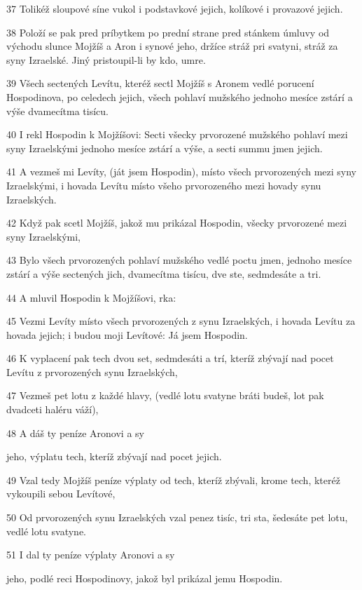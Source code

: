 \par 37 Tolikéž sloupové síne vukol i podstavkové jejich, kolíkové i provazové jejich.
\par 38 Položí se pak pred príbytkem po prední strane pred stánkem úmluvy od východu slunce Mojžíš a Aron i synové jeho, držíce stráž pri svatyni, stráž za syny Izraelské. Jiný pristoupil-li by kdo, umre.
\par 39 Všech sectených Levítu, kteréž sectl Mojžíš s Aronem vedlé porucení Hospodinova, po celedech jejich, všech pohlaví mužského jednoho mesíce zstárí a výše dvamecítma tisícu.
\par 40 I rekl Hospodin k Mojžíšovi: Secti všecky prvorozené mužského pohlaví mezi syny Izraelskými jednoho mesíce zstárí a výše, a secti summu jmen jejich.
\par 41 A vezmeš mi Levíty, (ját jsem Hospodin), místo všech prvorozených mezi syny Izraelskými, i hovada Levítu místo všeho prvorozeného mezi hovady synu Izraelských.
\par 42 Když pak scetl Mojžíš, jakož mu prikázal Hospodin, všecky prvorozené mezi syny Izraelskými,
\par 43 Bylo všech prvorozených pohlaví mužského vedlé poctu jmen, jednoho mesíce zstárí a výše sectených jich, dvamecítma tisícu, dve ste, sedmdesáte a tri.
\par 44 A mluvil Hospodin k Mojžíšovi, rka:
\par 45 Vezmi Levíty místo všech prvorozených z synu Izraelských, i hovada Levítu za hovada jejich; i budou moji Levítové: Já jsem Hospodin.
\par 46 K vyplacení pak tech dvou set, sedmdesáti a trí, kteríž zbývají nad pocet Levítu z prvorozených synu Izraelských,
\par 47 Vezmeš pet lotu z každé hlavy, (vedlé lotu svatyne bráti budeš, lot pak dvadceti haléru váží),
\par 48 A dáš ty peníze Aronovi a sy\par jeho, výplatu tech, kteríž zbývají nad pocet jejich.
\par 49 Vzal tedy Mojžíš peníze výplaty od tech, kteríž zbývali, krome tech, kteréž vykoupili sebou Levítové,
\par 50 Od prvorozených synu Izraelských vzal penez tisíc, tri sta, šedesáte pet lotu, vedlé lotu svatyne.
\par 51 I dal ty peníze výplaty Aronovi a sy\par jeho, podlé reci Hospodinovy, jakož byl prikázal jemu Hospodin.

